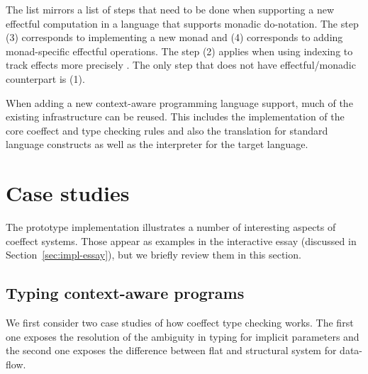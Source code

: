 \noindent
The list mirrors a list of steps that need to be done when supporting a new effectful computation
in a language that supports monadic do-notation. The step (3) corresponds to implementing a new
monad and (4) corresponds to adding monad-specific effectful operations. The step (2) applies when
using indexing to track effects more precisely \cite{effects-embedding}. The only step that does not
have effectful/monadic counterpart is (1).

When adding a new context-aware programming language support, much of the existing infrastructure
can be reused. This includes the implementation of the core coeffect and type checking rules and
also the translation for standard language constructs as well as the interpreter for the target
language.


%
%

\section{Case studies}
\label{sec:impl-case}

The prototype implementation illustrates a number of interesting aspects of coeffect systems.
Those appear as examples in the interactive essay (discussed in Section~\ref{sec:impl-essay}), but
we briefly review them in this section.


\subsection{Typing context-aware programs}
\label{sec:impl-case-typing}

We first consider two case studies of how coeffect type checking works. The first one exposes the
resolution of the ambiguity in typing for implicit parameters and the second one exposes the
difference between flat and structural system for data-flow.

